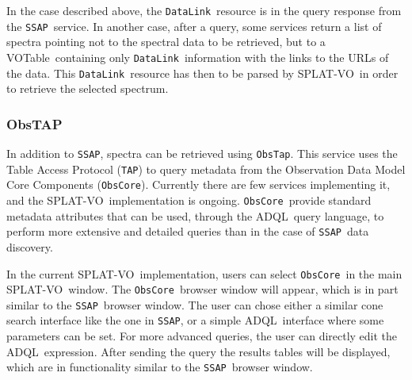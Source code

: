 \documentclass[final,authoryear,5p,times,twocolumn]{elsarticle}
\newcommand{\datalink}{\texttt{DataLink}}
\newcommand{\ssap}{\texttt{SSAP}}
\newcommand{\obstap}{\texttt{ObsTap}}
\newcommand{\tap}{\texttt{TAP}}
\newcommand{\obscore}{\texttt{ObsCore}}
\newcommand{\votable}{VOTable}
\newcommand{\adql}{ADQL}
\newcommand{\splatvo}{{\textsf{\small{SPLAT-VO}}}}
\begin{document}
In the case described above, the \datalink\ resource is in the query response
from the \ssap\ service. In another case, after a query, some services return a
list of spectra pointing not to the spectral data to be retrieved, but to a
\votable\ containing only \datalink\ information with the links to the URLs of
the data. This \datalink\ resource has then to be parsed by \splatvo\ in order
to retrieve the selected spectrum.

\subsubsection{ObsTAP}
%
In addition to \ssap, spectra can be retrieved using \obstap. This service uses
the Table Access Protocol (\tap) to query metadata from the Observation Data
Model Core Components (\obscore). Currently there are few services implementing
it, and the \splatvo\ implementation is ongoing.  \obscore\ provide standard
metadata attributes that can be used, through the \adql\ query language, to
perform more extensive and detailed queries than in the case of \ssap\ data
discovery.

In the current \splatvo\ implementation, users can select \obscore\ in the main
\splatvo\ window. The \obscore\ browser window will appear, which is in part
similar to the \ssap\ browser window. The user can chose either a similar cone
search interface like the one in \ssap, or a simple \adql\ interface where some
parameters can be set. For more advanced queries, the user can directly edit
the \adql\ expression. After sending the query the results tables will be
displayed, which are in functionality similar to the \ssap\ browser window.
\end{document}
